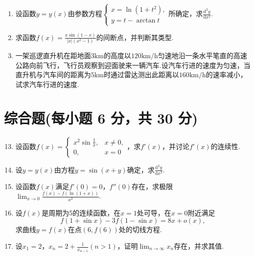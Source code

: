 \documentclass[../Main.tex]{subfiles}
\begin{document}
\begin{enumerate}
    \item 设函数$y=y(x)$由参数方程$\begin{cases}
                  x=\ln(1+t^{2}), \\
                  y=t-\arctan t
              \end{cases}$所确定，求$\frac{\mathrm{d}^{2}y}{\mathrm{d}x^{2}}$.
          \vspace{8em}

    \item 求函数$f(x)=\frac{x\sin(1-x)}{|x|(x^{2}-1)}$的间断点，并判断其类型.
          \vspace{7em}

    \item 一架巡逻直升机在距地面$3\mathrm{km}$的高度以$120\mathrm{km/h}$匀速地沿一条水平笔直的高速公路向前飞行，飞行员观察到迎面驶来一辆汽车.设汽车行进的速度为匀速，当直升机与汽车间的距离为$5
              \mathrm{km}$时通过雷达测出此距离以$160\mathrm{km/h}$的速率减小，试求汽车行进的速度.
          \vspace{7em}
\end{enumerate}

\section{综合题(每小题 6 分，共 30 分)}
\begin{enumerate}
    \setcounter{enumi}{12}
    \item 设函数$f(x)=
              \begin{cases}
                  x^{2}\sin\frac{1}{x}, & x\neq0, \\
                  0,                    & x=0
              \end{cases}$，求$f'(x)$，并讨论$f'(x)$的连续性.
          \vspace{8em}

    \item 设$y=y(x)$由方程$y=\sin(x+y)$确定，求$\frac{\mathrm{d}^{2} y}{\mathrm{d}x^{2}}$.
          \vspace{9em}

    \item 设函数$f(x)$满足$f'(0)=0$，$f''(0)$存在，求极限$\lim_{x\to0}\frac{f(x)-f(\ln(1+x))}{x^{3}}$.
          \vspace{9em}

    \item 设$f(x)$是周期为5的连续函数，在$x=1$处可导，在$x=0$附近满足
          \[
              f(1+\sin x)-3f(1-\sin x)=8x+o(x),
          \]
          求曲线$y=f(x)$在点$(6, f(6))$处的切线方程.
          \vspace{10em}

    \item 设$x_{1}=2$，$x_{n}=2+\frac{1}{x_{n-1}}(n>1)$，证明$\lim_{n\to\infty}
              x_{n}$存在，并求其值.
          \vspace{10em}
\end{enumerate}
\end{document}
